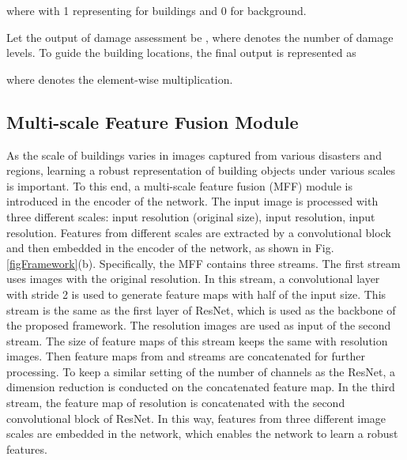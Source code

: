 \documentclass[journal]{IEEEtran}
\begin{document}
where  with 1 representing for buildings and 0 for background.

Let the output of damage assessment be , where  denotes the number of damage levels. To guide the building locations, the final output  is represented as

where  denotes the element-wise multiplication. 

\subsection{Multi-scale Feature Fusion Module}
As the scale of buildings varies in images captured from various disasters and regions, learning a robust representation of building objects under various scales is important. To this end, a multi-scale feature fusion (MFF) module is introduced in the encoder of the network. The input image is processed with three different scales:   input resolution (original size),  input resolution,  input resolution. Features from different scales are extracted by a convolutional block and then embedded in the encoder of the network, as shown in Fig. \ref{figFramework}(b). Specifically, the MFF contains three streams. The first stream uses images with the original resolution. In this stream, a convolutional layer with stride 2 is used to generate feature maps with half of the input size. This stream is the same as the first layer of ResNet, which is used as the backbone of the proposed framework.
The   resolution images are used as input of the second stream. The size of feature maps of this stream keeps the same with  resolution images. Then feature maps from  and  streams are concatenated for further processing. To keep a similar setting of the number of channels as the ResNet, a dimension reduction is conducted on the concatenated feature map. In the third stream, the feature map of  resolution is concatenated with the second convolutional block of ResNet. In this way, features from three different image scales are embedded in the network, which enables the network to learn a robust features.
\end{document}
